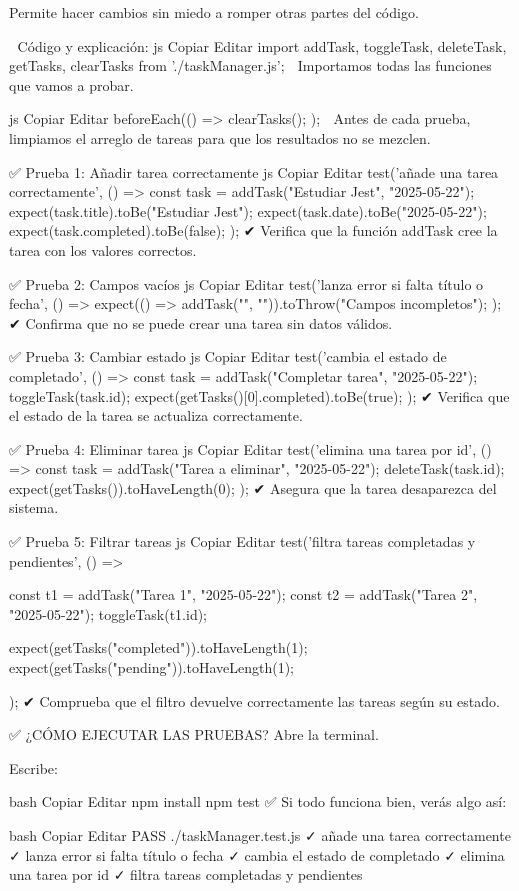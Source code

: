 Permite hacer cambios sin miedo a romper otras partes del código.

📄 Código y explicación:
js
Copiar
Editar
import {
  addTask,
  toggleTask,
  deleteTask,
  getTasks,
  clearTasks
} from './taskManager.js';
📌 Importamos todas las funciones que vamos a probar.

js
Copiar
Editar
beforeEach(() => {
  clearTasks();
});
📌 Antes de cada prueba, limpiamos el arreglo de tareas para que los resultados no se mezclen.

✅ Prueba 1: Añadir tarea correctamente
js
Copiar
Editar
test('añade una tarea correctamente', () => {
  const task = addTask("Estudiar Jest", "2025-05-22");
  expect(task.title).toBe("Estudiar Jest");
  expect(task.date).toBe("2025-05-22");
  expect(task.completed).toBe(false);
});
✔ Verifica que la función addTask cree la tarea con los valores correctos.

✅ Prueba 2: Campos vacíos
js
Copiar
Editar
test('lanza error si falta título o fecha', () => {
  expect(() => addTask("", "")).toThrow("Campos incompletos");
});
✔ Confirma que no se puede crear una tarea sin datos válidos.

✅ Prueba 3: Cambiar estado
js
Copiar
Editar
test('cambia el estado de completado', () => {
  const task = addTask("Completar tarea", "2025-05-22");
  toggleTask(task.id);
  expect(getTasks()[0].completed).toBe(true);
});
✔ Verifica que el estado de la tarea se actualiza correctamente.

✅ Prueba 4: Eliminar tarea
js
Copiar
Editar
test('elimina una tarea por id', () => {
  const task = addTask("Tarea a eliminar", "2025-05-22");
  deleteTask(task.id);
  expect(getTasks()).toHaveLength(0);
});
✔ Asegura que la tarea desaparezca del sistema.

✅ Prueba 5: Filtrar tareas
js
Copiar
Editar
test('filtra tareas completadas y pendientes', () => {
  const t1 = addTask("Tarea 1", "2025-05-22");
  const t2 = addTask("Tarea 2", "2025-05-22");
  toggleTask(t1.id);

  expect(getTasks("completed")).toHaveLength(1);
  expect(getTasks("pending")).toHaveLength(1);
});
✔ Comprueba que el filtro devuelve correctamente las tareas según su estado.

✅ ¿CÓMO EJECUTAR LAS PRUEBAS?
Abre la terminal.

Escribe:

bash
Copiar
Editar
npm install
npm test
✅ Si todo funciona bien, verás algo así:

bash
Copiar
Editar
PASS  ./taskManager.test.js
✓ añade una tarea correctamente
✓ lanza error si falta título o fecha
✓ cambia el estado de completado
✓ elimina una tarea por id
✓ filtra tareas completadas y pendientes